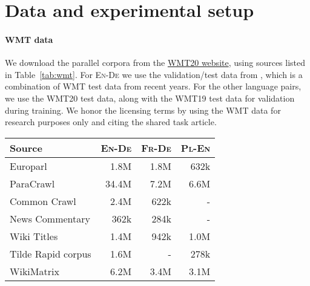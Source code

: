 \onecolumn
\appendix

\section{Data and experimental setup}
\label{ap:data}
\begin{minipage}{0.52\textwidth}
\paragraph{WMT data}
We download the parallel corpora from the \href{
https://www.statmt.org/wmt20/translation-task.html}{WMT20 website}, using sources listed in Table~\ref{tab:wmt}. For \textsc{En}-\textsc{De} we use the validation/test data from \citet{raunak2022finding}, which is a combination of WMT test data from recent years. For the other language pairs, we use the WMT20 test data, along with the WMT19 test data for validation during training. We honor the licensing terms by using the WMT data for research purposes only and citing the shared task article.
\end{minipage}
\begin{minipage}{0.47\textwidth}
    \small
    \centering
    \begin{tabular}{lrrr}
    \toprule
    \textbf{Source}      & \textsc{En}-\textsc{De} & \textsc{Fr}-\textsc{De} & \textsc{Pl}-\textsc{En}   \\\midrule\midrule
    Europarl    & 1.8M          & 1.8M  & 632k   \\
    ParaCrawl   & 34.4M         & 7.2M  & 6.6M   \\
    Common Crawl& 2.4M          & 622k  & -   \\
    News Commentary& 362k       & 284k  & -   \\
    Wiki Titles & 1.4M          & 942k  & 1.0M   \\
    Tilde Rapid corpus & 1.6M   & -     & 278k   \\
    WikiMatrix  & 6.2M          & 3.4M  & 3.1M   \\
    \bottomrule
    \end{tabular}
    \label{tab:wmt}
\end{minipage}

